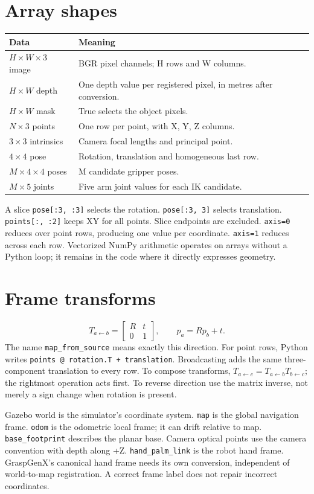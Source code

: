\documentclass[11pt,a4paper]{book}
\begin{document}
\section{Array shapes}
\begin{longtable}{p{}p{}}
Data & Meaning \\ \hline
$H\times W\times 3$ image & BGR pixel channels; H rows and W columns. \\
$H\times W$ depth & One depth value per registered pixel, in metres after conversion. \\
$H\times W$ mask & True selects the object pixels. \\
$N\times 3$ points & One row per point, with X, Y, Z columns. \\
$3\times 3$ intrinsics & Camera focal lengths and principal point. \\
$4\times 4$ pose & Rotation, translation and homogeneous last row. \\
$M\times4\times4$ poses & M candidate gripper poses. \\
$M\times5$ joints & Five arm joint values for each IK candidate. \\
\end{longtable}
A slice \texttt{pose[:3, :3]} selects the rotation. \texttt{pose[:3, 3]}
selects translation. \texttt{points[:, :2]} keeps XY for all points.
Slice endpoints are excluded. \texttt{axis=0} reduces over point rows, producing
one value per coordinate. \texttt{axis=1} reduces across each row.
Vectorized NumPy arithmetic operates on arrays without a Python loop; it remains
in the code where it directly expresses geometry.

\section{Frame transforms}
\[
T_{a\leftarrow b}=\begin{bmatrix}R&t\\0&1\end{bmatrix},\qquad
p_a=R p_b+t.
\]
The name \texttt{map\_from\_source} means exactly this direction. For point rows,
Python writes \texttt{points @ rotation.T + translation}. Broadcasting adds the
same three-component translation to every row. To compose transforms,
$T_{a\leftarrow c}=T_{a\leftarrow b}T_{b\leftarrow c}$; the rightmost operation
acts first. To reverse direction use the matrix inverse, not merely a sign change
when rotation is present.

Gazebo world is the simulator's coordinate system. \texttt{map} is the global
navigation frame. \texttt{odom} is the odometric local frame; it can drift relative
to map. \texttt{base\_footprint} describes the planar base. Camera optical points
use the camera convention with depth along +Z. \texttt{hand\_palm\_link} is the
robot hand frame. GraspGenX's canonical hand frame needs its own conversion,
independent of world-to-map registration. A correct frame label does not repair
incorrect coordinates.
\end{document}
